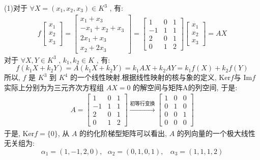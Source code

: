 \documentclass[11pt,a4paper,openany,oneside]{book}
\begin{document}
(1)对于 $ \forall X = (x_1, x_2, x_3) \in K^3 $ , 有:
\begin{gather*}
f
\begin{bmatrix}
x_1 \\ x_2 \\ x_3 
\end{bmatrix}
=
\begin{bmatrix}
x_1+x_3 \\
-x_1 + x_2 + x_3 \\
2x_1 + x_3 \\
x_2 + 2x_3
\end{bmatrix}
=
\begin{bmatrix}
1  &  0  &  1  \\
-1 &  1  &  1  \\
2  &  0  &  1  \\
0  &  1  &  2
\end{bmatrix}
\begin{bmatrix}
x_1 \\ x_2  \\ x_3 
\end{bmatrix}
=AX
\end{gather*}
对于 $ \forall X, Y \in K^3 $ ,  $ k_1, k_2 \in K $ , 有:
 $$  f(k_1X + k_2Y) = A(k_1X+k_2Y) = k_1AX + k_2AY = k_1f(X) + k_2f(Y)   $$ 
所以,  $ f $ 是 $ K^3 $ 到 $ K^4 $ 的一个线性映射.根据线性映射的核与象的定义,  $\mathrm{Ker}f$与 $ \mathrm{Im}f $ 实际上分别为为三元齐次方程组 $ AX=0 $ 的解空间与矩阵A的列空间, 于是:
\begin{gather*}
A=
\begin{bmatrix}
1  &  0  &  1  \\
-1 &  1  &  1  \\
2  &  0  &  1  \\
0  &  1  &  2
\end{bmatrix}
\xrightarrow{\text{初等行变换}}
\begin{bmatrix}
1 & 0 & 0 \\
0 & 1 & 0 \\
0 & 0 & 1  \\
0 & 0 & 0
\end{bmatrix}
\end{gather*}
于是,  $\mathrm{Ker}f= \{0\}$, 从 $ A $ 的约化阶梯型矩阵可以看出,  $ A $ 的列向量的一个极大线性无关组为:
 $$  \alpha_1 = (1, -1, 2, 0), \ \ \ \alpha_2 =(0,1,0,1), \ \ \ \ \alpha_3=(1,1,1,2)  $$  
\end{document}
